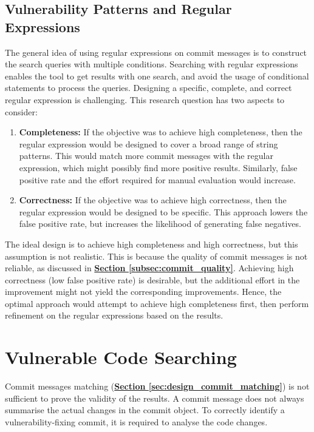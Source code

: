 \documentclass[12pt, a4paper]{report}
\begin{document}
\subsection{Vulnerability Patterns and Regular Expressions}
The general idea of using regular expressions on commit messages is to construct the search queries
with multiple conditions. Searching with regular expressions enables the tool to get results with
one search, and avoid the usage of conditional statements to process the queries. Designing a
specific, complete, and correct regular expression is challenging. This research question has two
aspects to consider:
\begin{enumerate}
  \item \textbf{Completeness:} If the objective was to achieve high completeness, then the regular
  expression would be designed to cover a broad range of string patterns. This would match more
  commit messages with the regular expression, which might possibly find more positive results.
  Similarly, false positive rate and the effort required for manual evaluation would increase.
  \item \textbf{Correctness:} If the objective was to achieve high correctness, then the regular
  expression would be designed to be specific. This approach lowers the false positive rate, but
  increases the likelihood of generating false negatives.
\end{enumerate}

The ideal design is to achieve high completeness and high correctness, but this assumption is not
realistic. This is because the quality of commit messages is not reliable, as discussed in
\hyperref[subsec:commit_quality]{\textbf{Section \ref{subsec:commit_quality}}}. Achieving high
correctness (low false positive rate) is desirable, but the additional effort in the improvement
might not yield the corresponding improvements. Hence, the optimal approach would attempt to achieve
high completeness first, then perform refinement on the regular expressions based on the results.

\section{Vulnerable Code Searching}
Commit messages matching (\hyperref[sec:design_commit_matching]{\textbf{Section
\ref*{sec:design_commit_matching}}}) is not sufficient to prove the validity of the results. A
commit message does not always summarise the actual changes in the commit object. To correctly
identify a vulnerability-fixing commit, it is required to analyse the code changes.
\end{document}
